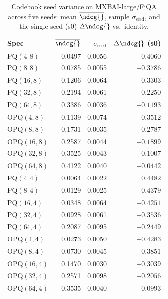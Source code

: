 \begin{table}[t]
\centering
\small
\caption{Codebook seed variance on MXBAI-large/FiQA across five seeds: mean $\overline{\ndcg{}}$, sample $\sigma_{\text{seed}}$, and the single-seed (s0) $\Delta\ndcg{}$ vs.\ identity.}
\label{tab:seed-variance-mxbai-large-fiqa}
\begin{tabular}{lrrr}
\toprule
Spec & $\overline{\ndcg{}}$ & $\sigma_{\text{seed}}$ & $\Delta\ndcg{}$ (s0) \\
\midrule
PQ$(4,8)$ & 0.0497 & 0.0056 & $-0.4060$ \\
PQ$(8,8)$ & 0.0785 & 0.0055 & $-0.3786$ \\
PQ$(16,8)$ & 0.1206 & 0.0064 & $-0.3303$ \\
PQ$(32,8)$ & 0.2194 & 0.0061 & $-0.2250$ \\
PQ$(64,8)$ & 0.3386 & 0.0036 & $-0.1193$ \\
OPQ$(4,8)$ & 0.1139 & 0.0074 & $-0.3512$ \\
OPQ$(8,8)$ & 0.1731 & 0.0035 & $-0.2787$ \\
OPQ$(16,8)$ & 0.2587 & 0.0044 & $-0.1899$ \\
OPQ$(32,8)$ & 0.3525 & 0.0043 & $-0.1007$ \\
OPQ$(64,8)$ & 0.4122 & 0.0040 & $-0.0442$ \\
PQ$(4,4)$ & 0.0064 & 0.0022 & $-0.4482$ \\
PQ$(8,4)$ & 0.0129 & 0.0025 & $-0.4379$ \\
PQ$(16,4)$ & 0.0348 & 0.0064 & $-0.4251$ \\
PQ$(32,4)$ & 0.0928 & 0.0061 & $-0.3536$ \\
PQ$(64,4)$ & 0.2087 & 0.0095 & $-0.2449$ \\
OPQ$(4,4)$ & 0.0273 & 0.0050 & $-0.4283$ \\
OPQ$(8,4)$ & 0.0730 & 0.0045 & $-0.3851$ \\
OPQ$(16,4)$ & 0.1470 & 0.0030 & $-0.3039$ \\
OPQ$(32,4)$ & 0.2571 & 0.0098 & $-0.2056$ \\
OPQ$(64,4)$ & 0.3535 & 0.0040 & $-0.0993$ \\
\bottomrule
\end{tabular}
\end{table}

